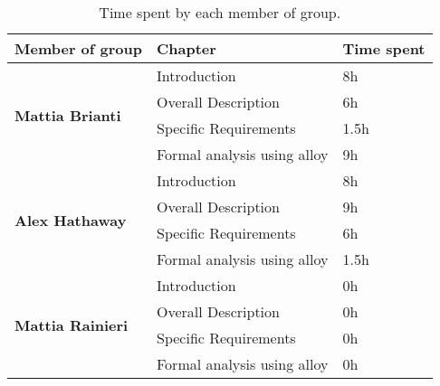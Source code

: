 \begin{table}[H]
      \centering
      \begin{tabular}{|l|l|l|}
            \hline
            \textbf{Member of group }                  & \textbf{Chapter}            & \textbf{Time spent} \\\hline
            \multirow{4}{*}{\textbf{Mattia Brianti}} & Introduction                & 8h                  \\
                                                       & Overall Description         & 6h                \\
                                                       & Specific Requirements       & 1.5h                 \\
                                                       & Formal analysis using alloy & 9h                 \\\hline
            \multirow{4}{*}{\textbf{Alex Hathaway}} & Introduction                & 8h                  \\
                                                       & Overall Description         & 9h                  \\
                                                       & Specific Requirements       & 6h                  \\
                                                       & Formal analysis using alloy & 1.5h                  \\\hline
            \multirow{4}{*}{\textbf{Mattia Rainieri}} & Introduction                & 0h                  \\
                                                       & Overall Description         & 0h                 \\
                                                       & Specific Requirements       & 0h                  \\
                                                       & Formal analysis using alloy & 0h                \\\hline
      \end{tabular}
      \caption{Time spent by each member of group.}
      \label{table:Time spent}
\end{table}
